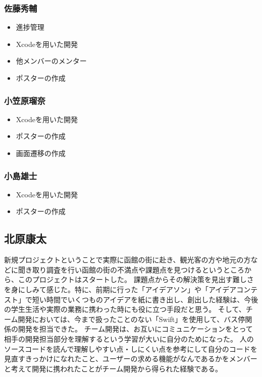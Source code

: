 \documentclass[openany,11pt,papersize]{jsbook}
\begin{document}
\subsubsection{佐藤秀輔}
\begin{itemize}
	\item 進捗管理
	\item Xcodeを用いた開発
  \item 他メンバーのメンター
  \item ポスターの作成
\end{itemize}

\subsubsection{小笠原瑠奈}
\begin{itemize}
	\item Xcodeを用いた開発
  \item ポスターの作成
  \item 画面遷移の作成
\end{itemize}

\subsubsection{小島雄士}
\begin{itemize}
	\item Xcodeを用いた開発
  \item ポスターの作成
\end{itemize}


\subsection{北原康太}
新規プロジェクトということで実際に函館の街に赴き、観光客の方や地元の方などに聞き取り調査を行い函館の街の不満点や課題点を見つけるというところから、このプロジェクトはスタートした。
課題点からその解決策を見出す難しさを身にしみて感じた。特に、前期に行った「アイデアソン」や「アイデアコンテスト」で短い時間でいくつものアイデアを紙に書き出し、創出した経験は、今後の学生生活や実際の業務に携わった時にも役に立つ手段だと思う。
そして、チーム開発においては、今まで扱ったことのない「Swift」を使用して、バス停関係の開発を担当できた。
チーム開発は、お互いにコミュニケーションをとって相手の開発担当部分を理解するという学習が大いに自分のためになった。
人のソースコードを読んで理解しやすい点・しにくい点を参考にして自分のコードを見直すきっかけになれたこと、ユーザーの求める機能がなんであるかをメンバーと考えて開発に携われたことがチーム開発から得られた経験である。
\end{document}
